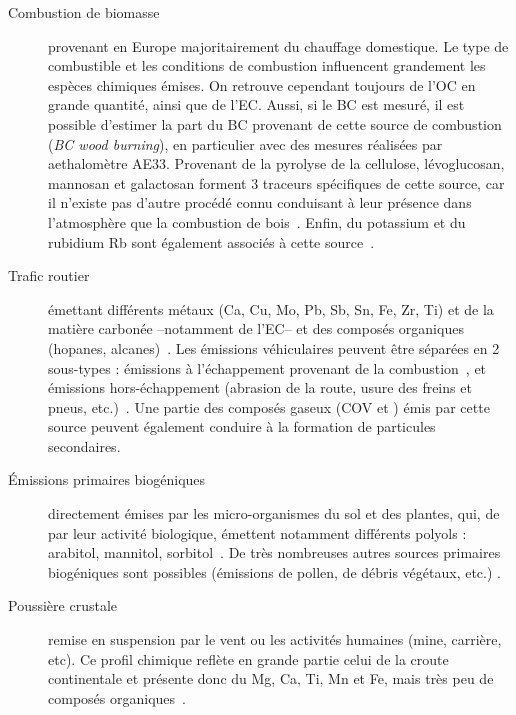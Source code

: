 \begin{description}
    \item[Combustion de biomasse] provenant en Europe majoritairement du chauffage
        domestique. Le type de combustible et les conditions de combustion influencent
        grandement les espèces chimiques émises. On retrouve cependant toujours de
        l'OC en grande quantité, ainsi que de l'EC. Aussi, si le BC est mesuré, il est
        possible d'estimer la part du BC provenant de cette source de combustion \BCwb{}
        (\textit{BC wood burning}), en particulier avec des mesures réalisées par
        aethalomètre AE33.
        Provenant de la pyrolyse de la cellulose, lévoglucosan, mannosan et
        galactosan forment 3 traceurs spécifiques de cette source, car il n'existe pas d'autre
        procédé connu conduisant à leur présence dans l'atmosphère que la combustion de
        bois~\autocite{jordanLevoglucosan2006,puxbaumLevoglucosan2007}.
        Enfin, du potassium  et du rubidium Rb sont également associés à cette
        source~\autocite{navaBiomass2015,gollyEtude2014,chevrierChauffage2016}.

    \item[Trafic routier] émettant différents métaux (Ca, Cu, Mo, Pb, Sb, Sn, Fe, Zr,
        Ti) et de la matière carbonée --notamment de l'EC-- et des composés organiques
        (hopanes, alcanes)~\autocite{schauerCharacterization2006,charronIdentification2019}. Les émissions
        véhiculaires peuvent être séparées en 2 sous-types : émissions à l'échappement
        provenant de la combustion~\autocite{allenSize2001,huMetals2009,vianaSource2008},
        et émissions hors-échappement (abrasion de la route, usure des freins et pneus,
        etc.)~\autocite{grigoratosBrake2015,sandersAirborne2003,sternbeckMetal2002}.
        Une partie des composés gaseux (COV et ) émis par cette source peuvent
        également conduire à la formation de particules secondaires.

    \item[Émissions primaires biogéniques] directement émises par les micro-organismes du sol
        et des plantes, qui, de par leur activité biologique, émettent notamment
        différents polyols : arabitol, mannitol,
        sorbitol~\autocite{bauerSignificant2008,yttriAmbient2007,samakePolyols2019}. De
        très nombreuses autres sources primaires biogéniques sont possibles (émissions de
        pollen, de débris végétaux, etc.) \autocite{samakePolyols2019}.

    \item[Poussière crustale] remise en suspension par le vent ou les activités humaines
        (mine, carrière, etc). Ce profil chimique reflète en grande partie celui de la croute continentale
        et présente donc du Mg, Ca, Ti, Mn et Fe, mais très peu de composés
        organiques~\autocite{almeidaSource2005,dallostoHourly2013,morenoVariations2011,putaudSizesegregated2004}.


\end{description}
